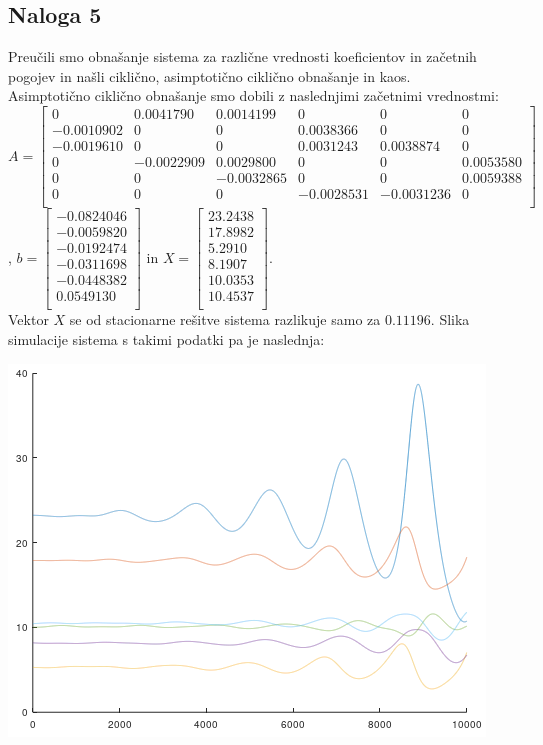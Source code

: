 \documentclass[a4paper, 12pt]{article}
\begin{document}
\subsection{Naloga 5}
Preučili smo obnašanje sistema za različne vrednosti koeficientov in začetnih pogojev in našli
ciklično, asimptotično ciklično obnašanje in kaos.\\
Asimptotično ciklično obnašanje smo dobili z naslednjimi začetnimi vrednostmi:\\
$ A =
\begin{bmatrix}
	0 & 0.0041790 & 0.0014199 & 0 & 0 & 0 \\
	-0.0010902 & 0 & 0 & 0.0038366 & 0 & 0 \\
	-0.0019610 & 0 & 0 & 0.0031243 & 0.0038874 & 0 \\
	0 & -0.0022909 & 0.0029800 & 0 & 0 & 0.0053580 \\
	0 & 0 & -0.0032865 & 0 & 0 & 0.0059388 \\
	0 & 0 & 0 & -0.0028531 & -0.0031236 & 0 \\
\end{bmatrix} $, 
$ b =
\begin{bmatrix}
	-0.0824046 \\
	-0.0059820 \\
	-0.0192474 \\
	-0.0311698 \\
	-0.0448382 \\
	0.0549130 \\
\end{bmatrix} $ in
$ X =
\begin{bmatrix}
	23.2438 \\
	17.8982 \\
	5.2910 \\
	8.1907 \\
	10.0353 \\
	10.4537 \\
\end{bmatrix} $. \\
Vektor $ X $ se od stacionarne rešitve sistema razlikuje samo za $ 0.11196 $. Slika simulacije
sistema s takimi podatki pa je naslednja:
\begin{center}
	\includegraphics{asimptotic_cyclic.png}
\end{center}
\end{document}
